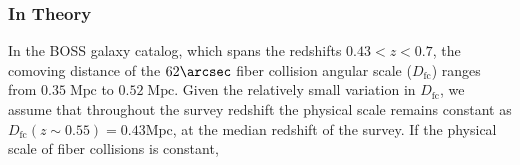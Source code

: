                                                                                                                                                                                                                                                                           \subsubsection{In Theory} \label{sec:tophat_theory}
                                                                                                                                                                                                                                                                          In the BOSS galaxy catalog, which spans the redshifts $0.43 < z < 0.7$, 
                                                                                                                                                                                                                                                                          the comoving distance of the $62 \arcsec$ fiber collision angular scale 
                                                                                                                                                                                                                                                                          ($D_\mathrm{fc}$) ranges from $0.35\;\mathrm{Mpc}$ to $0.52\;\mathrm{Mpc}$. 
                                                                                                                                                                                                                                                                          Given the relatively small variation in $D_\mathrm{fc}$, we assume 
                                                                                                                                                                                                                                                                          that throughout the survey redshift the physical scale remains
                                                                                                                                                                                                                                                                          constant as $D_\mathrm{fc}(z \sim 0.55) = 0.43 \mathrm{Mpc}$, at the median 
                                                                                                                                                                                                                                                                          redshift of the survey. If the physical scale of fiber collisions is constant, 
